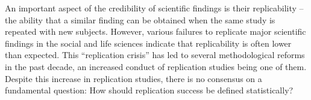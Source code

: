 An important aspect of the credibility of scientific findings is their
replicability -- the ability that a similar finding can be obtained when the
same study is repeated with new subjects. However, various failures to replicate
major scientific findings in the social and life sciences indicate that
replicability is often lower than expected. This ``replication crisis'' has led
to several methodological reforms in the past decade, an increased conduct of
replication studies being one of them. Despite this increase in replication
studies, there is no consensus on a fundamental question: How should replication
success be defined statistically?

